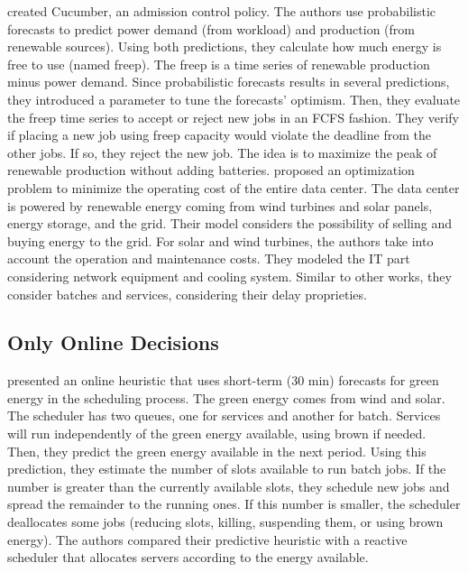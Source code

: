 \citeauthor{wiesner2022cucumber} created Cucumber, an admission control policy. The authors use probabilistic forecasts to predict power demand (from workload) and production (from renewable sources). Using both predictions, they calculate how much energy is free to use (named freep). The freep is a time series of renewable production minus power demand. Since probabilistic forecasts results in several predictions, they introduced a parameter to tune the forecasts' optimism. Then, they evaluate the freep time series to accept or reject new jobs in an FCFS fashion. They verify if placing a new job using freep capacity would violate the deadline from the other jobs. If so, they reject the new job. The idea is to maximize the peak of renewable production without adding batteries. \citeauthor{yuan2022optimal} proposed an optimization problem to minimize the operating cost of the entire data center. The data center is powered by renewable energy coming from wind turbines and solar panels, energy storage, and the grid. Their model considers the possibility of selling and buying energy to the grid. For solar and wind turbines, the authors take into account the operation and maintenance costs. They modeled the IT part considering network equipment and cooling system. Similar to other works, they consider batches and services, considering their delay proprieties. 

\subsection{Only Online Decisions}

\citeauthor{aksanli2011utilizing} \cite{aksanli2011utilizing} presented an online heuristic that uses short-term (30 min) forecasts for green energy in the scheduling process. The green energy comes from wind and solar. The scheduler has two queues, one for services and another for batch. Services will run independently of the green energy available, using brown if needed. Then, they predict the green energy available in the next period. Using this prediction, they estimate the number of slots available to run batch jobs. If the number is greater than the currently available slots, they schedule new jobs and spread the remainder to the running ones. If this number is smaller, the scheduler deallocates some jobs (reducing slots, killing, suspending them, or using brown energy). The authors compared their predictive heuristic with a reactive scheduler that allocates servers according to the energy available.

